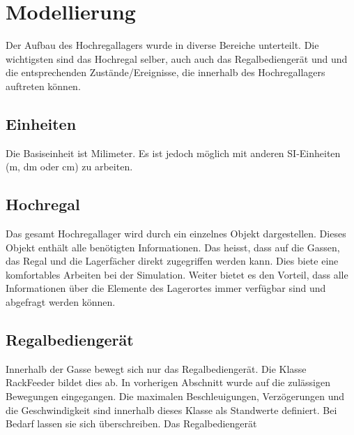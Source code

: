 \section{Modellierung}
Der Aufbau des Hochregallagers wurde in diverse Bereiche unterteilt. Die wichtigsten sind das Hochregal selber, auch auch das Regalbediengerät und und die entsprechenden Zustände/Ereignisse, die innerhalb des Hochregallagers auftreten können. 
%
\subsection{Einheiten}
Die Basiseinheit ist Milimeter. Es ist jedoch möglich mit anderen SI-Einheiten (m, dm oder cm) zu arbeiten.
%
\subsection{Hochregal}
Das gesamt Hochregallager wird durch ein einzelnes Objekt dargestellen. Dieses Objekt enthält alle benötigten Informationen. Das heisst, dass auf die Gassen, das Regal und die Lagerfächer direkt zugegriffen werden kann. Dies biete eine komfortables Arbeiten bei der Simulation. Weiter bietet es den Vorteil, dass alle Informationen über die Elemente des Lagerortes immer verfügbar sind und abgefragt werden können.
%
\subsection{Regalbediengerät}
Innerhalb der Gasse bewegt sich nur das Regalbediengerät. Die Klasse RackFeeder bildet dies ab. In vorherigen Abschnitt wurde auf die zulässigen Bewegungen eingegangen. Die maximalen Beschleuigungen, Verzögerungen und die Geschwindigkeit sind innerhalb dieses Klasse als Standwerte definiert. Bei Bedarf lassen sie sich überschreiben. Das Regalbediengerät 
%
